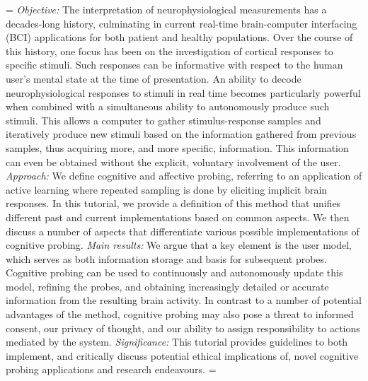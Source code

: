 \abstract%
\newdimen\origiwspc%
\origiwspc=\font%
\origiwspc%
\emph{Objective:} The interpretation of neurophysiological measurements has a decades-long history, culminating in current real-time brain-computer interfacing (BCI) applications for both patient and healthy populations. Over the course of this history, one focus has been on the investigation of cortical responses to specific stimuli. Such responses can be informative with respect to the human user's mental state at the time of presentation. An ability to decode neurophysiological responses to stimuli in real time becomes particularly powerful when combined with a simultaneous ability to autonomously produce such stimuli. This allows a computer to gather stimulus-response samples and iteratively produce new stimuli based on the information gathered from previous samples, thus acquiring more, and more specific, information. This information can even be obtained without the explicit, voluntary involvement of the user.
\emph{Approach:} We define cognitive and affective probing, referring to an application of active learning where repeated sampling is done by eliciting implicit brain responses. In this tutorial, we provide a definition of this method that unifies different past and current implementations based on common aspects. We then discuss a number of aspects that differentiate various possible implementations of cognitive probing.
\emph{Main results:} We argue that a key element is the user model, which serves as both information storage and basis for subsequent probes. Cognitive probing can be used to continuously and autonomously update this model, refining the probes, and obtaining increasingly detailed or accurate information from the resulting brain activity. In contrast to a number of potential advantages of the method, cognitive probing may also pose a threat to informed consent, our privacy of thought, and our ability to assign responsibility to actions mediated by the system. \emph{Significance:} This tutorial provides guidelines to both implement, and critically discuss potential ethical implications of, novel cognitive probing applications and research endeavours.
\font=\origiwspc%


\clearpage


\pagestyle{cp}


